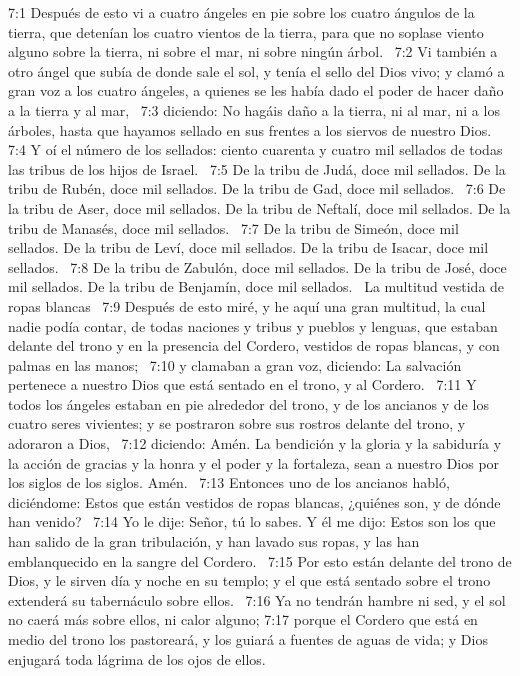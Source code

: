 7:1 Después de esto vi a cuatro ángeles en pie sobre los cuatro ángulos de la tierra, que detenían los cuatro vientos de la tierra, para que no soplase viento alguno sobre la tierra, ni sobre el mar, ni sobre ningún árbol.  
7:2 Vi también a otro ángel que subía de donde sale el sol, y tenía el sello del Dios vivo; y clamó a gran voz a los cuatro ángeles, a quienes se les había dado el poder de hacer daño a la tierra y al mar,  
7:3 diciendo: No hagáis daño a la tierra, ni al mar, ni a los árboles, hasta que hayamos sellado en sus frentes a los siervos de nuestro Dios. 
7:4 Y oí el número de los sellados: ciento cuarenta y cuatro mil sellados de todas las tribus de los hijos de Israel.  
7:5 De la tribu de Judá, doce mil sellados. De la tribu de Rubén, doce mil sellados. De la tribu de Gad, doce mil sellados.  
7:6 De la tribu de Aser, doce mil sellados. De la tribu de Neftalí, doce mil sellados. De la tribu de Manasés, doce mil sellados.  
7:7 De la tribu de Simeón, doce mil sellados. De la tribu de Leví, doce mil sellados. De la tribu de Isacar, doce mil sellados.  
7:8 De la tribu de Zabulón, doce mil sellados. De la tribu de José, doce mil sellados. De la tribu de Benjamín, doce mil sellados.  
La multitud vestida de ropas blancas  
7:9 Después de esto miré, y he aquí una gran multitud, la cual nadie podía contar, de todas naciones y tribus y pueblos y lenguas, que estaban delante del trono y en la presencia del Cordero, vestidos de ropas blancas, y con palmas en las manos;  
7:10 y clamaban a gran voz, diciendo: La salvación pertenece a nuestro Dios que está sentado en el trono, y al Cordero.  
7:11 Y todos los ángeles estaban en pie alrededor del trono, y de los ancianos y de los cuatro seres vivientes; y se postraron sobre sus rostros delante del trono, y adoraron a Dios,  
7:12 diciendo: Amén. La bendición y la gloria y la sabiduría y la acción de gracias y la honra y el poder y la fortaleza, sean a nuestro Dios por los siglos de los siglos. Amén.  
7:13 Entonces uno de los ancianos habló, diciéndome: Estos que están vestidos de ropas blancas, ¿quiénes son, y de dónde han venido?  
7:14 Yo le dije: Señor, tú lo sabes. Y él me dijo: Estos son los que han salido de la gran tribulación, y han lavado sus ropas, y las han emblanquecido en la sangre del Cordero.  
7:15 Por esto están delante del trono de Dios, y le sirven día y noche en su templo; y el que está sentado sobre el trono extenderá su tabernáculo sobre ellos.  
7:16 Ya no tendrán hambre ni sed, y el sol no caerá más sobre ellos, ni calor alguno; 
7:17 porque el Cordero que está en medio del trono los pastoreará, y los guiará a fuentes de aguas de vida; y Dios enjugará toda lágrima de los ojos de ellos. 
